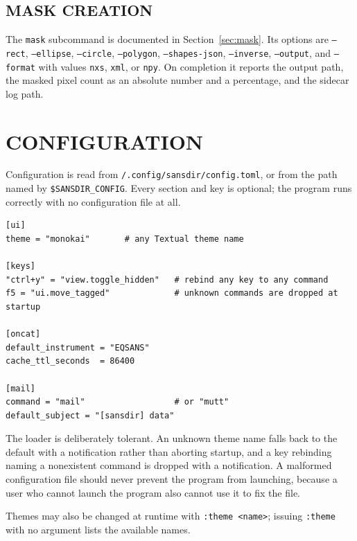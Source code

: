 \documentclass[tm]{ornltm}
\newcommand{\hme}{\raisebox{0.4ex}{\texttildelow}}
\begin{document}
\subsection{MASK CREATION}

The \texttt{mask} subcommand is documented in Section~\ref{sec:mask}. Its options
are \texttt{--rect}, \texttt{--ellipse}, \texttt{--circle}, \texttt{--polygon},
\texttt{--shapes-json}, \texttt{--inverse}, \texttt{--output}, and
\texttt{--format} with values \texttt{nxs}, \texttt{xml}, or \texttt{npy}. On
completion it reports the output path, the masked pixel count as an absolute
number and a percentage, and the sidecar log path.

\section{CONFIGURATION}
\label{sec:config}

Configuration is read from \texttt{\hme/.config/sansdir/config.toml}, or from the
path named by \texttt{\$SANSDIR\_CONFIG}. Every section and key is optional; the
program runs correctly with no configuration file at all.

\begin{lstlisting}
[ui]
theme = "monokai"       # any Textual theme name

[keys]
"ctrl+y" = "view.toggle_hidden"   # rebind any key to any command
f5 = "ui.move_tagged"             # unknown commands are dropped at startup

[oncat]
default_instrument = "EQSANS"
cache_ttl_seconds  = 86400

[mail]
command = "mail"                  # or "mutt"
default_subject = "[sansdir] data"
\end{lstlisting}

The loader is deliberately tolerant. An unknown theme name falls back to the
default with a notification rather than aborting startup, and a key rebinding
naming a nonexistent command is dropped with a notification. A malformed
configuration file should never prevent the program from launching, because a
user who cannot launch the program also cannot use it to fix the file.

Themes may also be changed at runtime with \texttt{:theme <name>}; issuing
\texttt{:theme} with no argument lists the available names.
\end{document}

